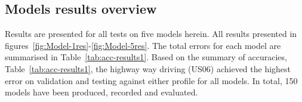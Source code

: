 %
%
\subsection{Models results overview}
Results are presented for all tests on five models herein.
All results presented in figures~\ref{fig:Model-1res}-\ref{fig:Model-5res}.
The total errors for each model are summarised in Table~\ref{tab:acc-results1}.
Based on the summary of accuracies, Table~\ref{tab:acc-results1}, the highway way driving (US06) achieved the highest error on validation and testing against either profile for all models.
In total, 150 models have been produced, recorded and evaluated.




